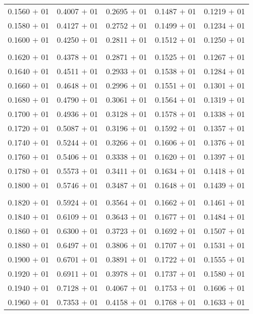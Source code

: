 \documentclass[a4paper,11pt]{article}
\begin{document}
\begin{center}
\begin{longtable}{ c c c c c }
0.1560 $+$ 01 & 0.4007 $+$ 01 & 0.2695 $+$ 01 & 0.1487 $+$ 01 & 0.1219 $+$ 01 \\
0.1580 $+$ 01 & 0.4127 $+$ 01 & 0.2752 $+$ 01 & 0.1499 $+$ 01 & 0.1234 $+$ 01 \\
0.1600 $+$ 01 & 0.4250 $+$ 01 & 0.2811 $+$ 01 & 0.1512 $+$ 01 & 0.1250 $+$ 01 \\
\\
0.1620 $+$ 01 & 0.4378 $+$ 01 & 0.2871 $+$ 01 & 0.1525 $+$ 01 & 0.1267 $+$ 01 \\
0.1640 $+$ 01 & 0.4511 $+$ 01 & 0.2933 $+$ 01 & 0.1538 $+$ 01 & 0.1284 $+$ 01 \\
0.1660 $+$ 01 & 0.4648 $+$ 01 & 0.2996 $+$ 01 & 0.1551 $+$ 01 & 0.1301 $+$ 01 \\
0.1680 $+$ 01 & 0.4790 $+$ 01 & 0.3061 $+$ 01 & 0.1564 $+$ 01 & 0.1319 $+$ 01 \\
0.1700 $+$ 01 & 0.4936 $+$ 01 & 0.3128 $+$ 01 & 0.1578 $+$ 01 & 0.1338 $+$ 01 \\
0.1720 $+$ 01 & 0.5087 $+$ 01 & 0.3196 $+$ 01 & 0.1592 $+$ 01 & 0.1357 $+$ 01 \\
0.1740 $+$ 01 & 0.5244 $+$ 01 & 0.3266 $+$ 01 & 0.1606 $+$ 01 & 0.1376 $+$ 01 \\
0.1760 $+$ 01 & 0.5406 $+$ 01 & 0.3338 $+$ 01 & 0.1620 $+$ 01 & 0.1397 $+$ 01 \\
0.1780 $+$ 01 & 0.5573 $+$ 01 & 0.3411 $+$ 01 & 0.1634 $+$ 01 & 0.1418 $+$ 01 \\
0.1800 $+$ 01 & 0.5746 $+$ 01 & 0.3487 $+$ 01 & 0.1648 $+$ 01 & 0.1439 $+$ 01 \\
\\
0.1820 $+$ 01 & 0.5924 $+$ 01 & 0.3564 $+$ 01 & 0.1662 $+$ 01 & 0.1461 $+$ 01 \\
0.1840 $+$ 01 & 0.6109 $+$ 01 & 0.3643 $+$ 01 & 0.1677 $+$ 01 & 0.1484 $+$ 01 \\
0.1860 $+$ 01 & 0.6300 $+$ 01 & 0.3723 $+$ 01 & 0.1692 $+$ 01 & 0.1507 $+$ 01 \\
0.1880 $+$ 01 & 0.6497 $+$ 01 & 0.3806 $+$ 01 & 0.1707 $+$ 01 & 0.1531 $+$ 01 \\
0.1900 $+$ 01 & 0.6701 $+$ 01 & 0.3891 $+$ 01 & 0.1722 $+$ 01 & 0.1555 $+$ 01 \\
0.1920 $+$ 01 & 0.6911 $+$ 01 & 0.3978 $+$ 01 & 0.1737 $+$ 01 & 0.1580 $+$ 01 \\
0.1940 $+$ 01 & 0.7128 $+$ 01 & 0.4067 $+$ 01 & 0.1753 $+$ 01 & 0.1606 $+$ 01 \\
0.1960 $+$ 01 & 0.7353 $+$ 01 & 0.4158 $+$ 01 & 0.1768 $+$ 01 & 0.1633 $+$ 01 \\

\end{longtable}
\end{center}
\end{document}
